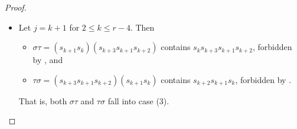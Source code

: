 \documentclass{amsart}
\theoremstyle{definition}
\begin{document}
\begin{appendices}
\begin{proof}
\begin{itemize}
\begin{itemize}
            \item $\tau\sigma= (s_{k+2}s_{k}s_{k+1})(s_{k+1}s_k)=s_{k+2}\in S$.
        \end{itemize}
        That is, $\sigma\tau$ falls into case (3) and $\tau\sigma$ falls into case (1).
        \item Let $j=k+1$ for $2\leq k\leq r-4$. Then \begin{itemize}
            \item $\sigma\tau=(s_{k+1}s_k)(s_{k+3}s_{k+1}s_{k+2})$ contains $s_ks_{k+3}s_{k+1}s_{k+2}$, forbidden by , and
            \item $\tau\sigma= (s_{k+3}s_{k+1}s_{k+2})(s_{k+1}s_k)$ contains $s_{k+2}s_{k+1}s_k$, forbidden by .
        \end{itemize}
        That is, both $\sigma\tau$ and $\tau\sigma$ fall into case (3).
    \end{itemize}
\smallskip


\end{proof}
\end{appendices}
\end{document}
